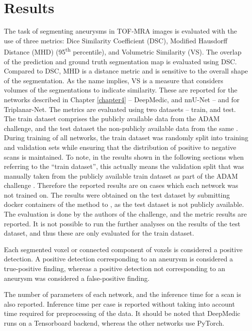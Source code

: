 \chapter{Results}
\label{chapter6}

The task of segmenting aneurysms in TOF-MRA images is evaluated with the use of three metrics: Dice Similarity Coefficient (DSC), Modified Hausdorff Distance (MHD) (95\textsuperscript{th} percentile), and Volumetric Similarity (VS). The overlap of the prediction and ground truth segmentation map is evaluated using DSC. Compared to DSC, MHD is a distance metric and is sensitive to the overall shape of the segmentation. As the name implies, VS is a measure that considers volumes of the segmentations to indicate similarity. These are reported for the networks described in Chapter \ref{chapter4} -- DeepMedic, and nnU-Net -- and for Triplanar-Net. The metrics are evaluated using two datasets -- train, and test. The train dataset comprises the publicly available data from the ADAM challenge, and the test dataset the non-publicly available data from the same \cite{Timmins2020}. During training of all networks, the train dataset was randomly split into training and validation sets while ensuring that the distribution of positive to negative scans is maintained. To note, in the results shown in the following sections when referring to the ``train dataset'', this actually means the validation split that was manually taken from the publicly available train dataset as part of the ADAM challenge \cite{Timmins2020}. Therefore the reported results are on cases which each network was not trained on. The results were obtained on the test dataset by submitting docker containers of the method to \citeauthor{Timmins2020}, as the test dataset is not publicly available. The evaluation is done by the authors of the challenge, and the metric results are reported. It is not possible to run the further analyses on the results of the test dataset, and thus these are only evaluated for the train dataset.

Each segmented voxel or connected component of voxels is considered a positive detection. A positive detection corresponding to an aneurysm is considered a true-positive finding, whereas a positive detection not corresponding to an aneurysm was considered a false-positive finding.

The number of parameters of each network, and the inference time for a scan is also reported. Inference time per case is reported without taking into account time required for preprocessing of the data. It should be noted that DeepMedic runs on a Tensorboard backend, whereas the other networks use PyTorch. 

